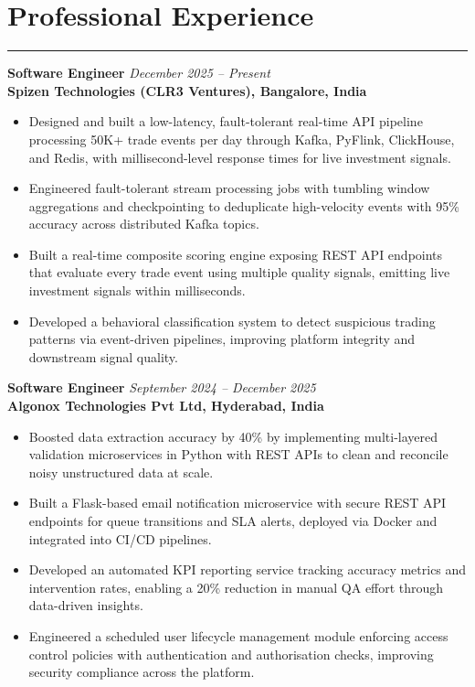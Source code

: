 \documentclass[10pt]{article}
\begin{document}
\section*{Professional Experience}
\vspace{1pt}\hrule\vspace{4pt}

\textbf{Software Engineer} \hfill \textit{December 2025 -- Present} \\
\textbf{Spizen Technologies (CLR3 Ventures), Bangalore, India}
\begin{itemize}
  \item Designed and built a low-latency, fault-tolerant real-time API pipeline processing 50K+ trade events per day through Kafka, PyFlink, ClickHouse, and Redis, with millisecond-level response times for live investment signals.
  \item Engineered fault-tolerant stream processing jobs with tumbling window aggregations and checkpointing to deduplicate high-velocity events with 95\% accuracy across distributed Kafka topics.
  \item Built a real-time composite scoring engine exposing REST API endpoints that evaluate every trade event using multiple quality signals, emitting live investment signals within milliseconds.
  \item Developed a behavioral classification system to detect suspicious trading patterns via event-driven pipelines, improving platform integrity and downstream signal quality.
\end{itemize}

\textbf{Software Engineer} \hfill \textit{September 2024 -- December 2025} \\
\textbf{Algonox Technologies Pvt Ltd, Hyderabad, India}
\begin{itemize}
  \item Boosted data extraction accuracy by 40\% by implementing multi-layered validation microservices in Python with REST APIs to clean and reconcile noisy unstructured data at scale.
  \item Built a Flask-based email notification microservice with secure REST API endpoints for queue transitions and SLA alerts, deployed via Docker and integrated into CI/CD pipelines.
  \item Developed an automated KPI reporting service tracking accuracy metrics and intervention rates, enabling a 20\% reduction in manual QA effort through data-driven insights.
  \item Engineered a scheduled user lifecycle management module enforcing access control policies with authentication and authorisation checks, improving security compliance across the platform.
\end{itemize}
\end{document}
